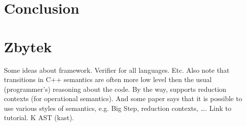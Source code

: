 \documentclass{fithesis3}
\begin{document}








\chapter{Conclusion}
	
\chapter{Zbytek}

Some ideas about \K framework. Verifier for all languages. Etc. Also note that transitions in C++ semantics are often more low level then the usual (programmer's) reasoning about the code. By the way, \K supports reduction contexts (for operational semantics). And some \K paper says that it is possible to use various styles of semantics, e.g. Big Step, reduction contexts, \ldots . Link to \K tutorial. K AST (kast).
\end{document}
